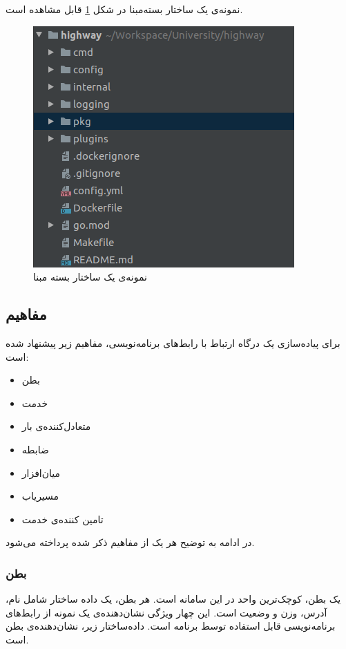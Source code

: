 نمونه‌ی یک ساختار بسته‌مبنا در شکل
\ref{package_oriented}
قابل مشاهده است.

\begin{figure}[H]
    \centering
    \caption{نمونه‌ی یک ساختار بسته مبنا}
    \label{package_oriented}
    \includegraphics[scale=0.4]{images/PackageOriented.png}
\end{figure}

\cleardoublepage

\subsection{مفاهیم}\label{subsec:impl_concepts}
برای پیاده‌سازی یک درگاه ارتباط با رابط‌های برنامه‌نویسی، مفاهیم زیر پیشنهاد شده است:

\begin{itemize}
    \item بطن 
    \item خدمت 
    \item متعادل‌کننده‌ی بار 
    \item ضابطه 
    \item میان‌افزار 
    \item مسیریاب 
    \item تامین کننده‌ی خدمت 
\end{itemize}

در ادامه به توضیح هر یک از مفاهیم ذکر‌ شده پرداخته‌ می‌شود.

\subsubsection{بطن}
یک بطن، کوچک‌ترین واحد در این سامانه است. هر بطن، یک داده ساختار شامل نام، آدرس، وزن و وضعیت است. این چهار ویژگی نشان‌دهنده‌ی یک نمونه از رابط‌های برنامه‌نویسی قابل استفاده توسط برنامه است. داده‌ساختار زیر، نشان‌دهنده‌ی بطن است.

